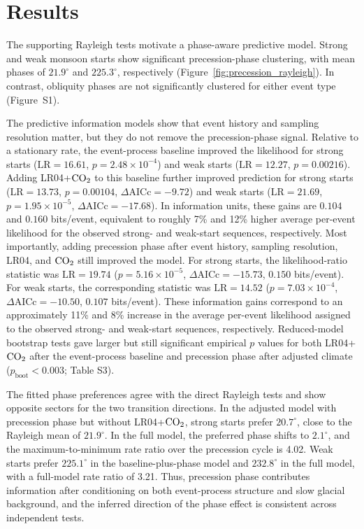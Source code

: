 \documentclass[11pt]{article}
\begin{document}
\section*{Results}

The supporting Rayleigh tests motivate a phase-aware predictive model. Strong and weak monsoon starts show significant precession-phase clustering, with mean phases of \(21.9^\circ\) and \(225.3^\circ\), respectively (Figure~\ref{fig:precession_rayleigh}). In contrast, obliquity phases are not significantly clustered for either event type (Figure~S1).

The predictive information models show that event history and sampling resolution matter, but they do not remove the precession-phase signal.
Relative to a stationary rate, the event-process baseline improved the likelihood for strong starts (\(\mathrm{LR}=16.61\), \(p=2.48\times10^{-4}\)) and weak starts (\(\mathrm{LR}=12.27\), \(p=0.00216\)).
Adding LR04+\(\ce{CO2}\) to this baseline further improved prediction for strong starts (\(\mathrm{LR}=13.73\), \(p=0.00104\), \(\Delta\mathrm{AICc}=-9.72\)) and weak starts (\(\mathrm{LR}=21.69\), \(p=1.95\times10^{-5}\), \(\Delta\mathrm{AICc}=-17.68\)).
In information units, these gains are \(0.104\) and \(0.160\) bits/event, equivalent to roughly 7\% and 12\% higher average per-event likelihood for the observed strong- and weak-start sequences, respectively.
Most importantly, adding precession phase after event history, sampling resolution, LR04, and \(\ce{CO2}\) still improved the model.
For strong starts, the likelihood-ratio statistic was \(\mathrm{LR}=19.74\) (\(p=5.16\times10^{-5}\), \(\Delta\mathrm{AICc}=-15.73\), \(0.150\) bits/event).
For weak starts, the corresponding statistic was \(\mathrm{LR}=14.52\) (\(p=7.03\times10^{-4}\), \(\Delta\mathrm{AICc}=-10.50\), \(0.107\) bits/event).
These information gains correspond to an approximately 11\% and 8\% increase in the average per-event likelihood assigned to the observed strong- and weak-start sequences, respectively.
Reduced-model bootstrap tests gave larger but still significant empirical \(p\) values for both LR04+\(\ce{CO2}\) after the event-process baseline and precession phase after adjusted climate (\(p_\mathrm{boot}<0.003\); Table S3).

The fitted phase preferences agree with the direct Rayleigh tests and show opposite sectors for the two transition directions. In the adjusted model with precession phase but without LR04+\(\ce{CO2}\), strong starts prefer \(20.7^\circ\), close to the Rayleigh mean of \(21.9^\circ\). In the full model, the preferred phase shifts to \(2.1^\circ\), and the maximum-to-minimum rate ratio over the precession cycle is 4.02. Weak starts prefer \(225.1^\circ\) in the baseline-plus-phase model and \(232.8^\circ\) in the full model, with a full-model rate ratio of 3.21. Thus, precession phase contributes information after conditioning on both event-process structure and slow glacial background, and the inferred direction of the phase effect is consistent across independent tests.
\end{document}

